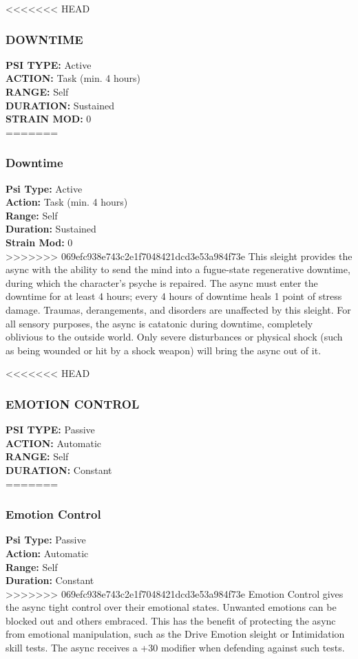 <<<<<<< HEAD \subsubsection{DOWNTIME} \textbf{PSI TYPE:} Active \\ \textbf{ACTION:} Task (min. 4 hours) \\ \textbf{RANGE:} Self \\ \textbf{DURATION:} Sustained \\ \textbf{STRAIN MOD:} 0 \\ ======= \subsubsection{Downtime} \textbf{Psi Type:} Active \\ \textbf{Action:} Task (min. 4 hours) \\ \textbf{Range:} Self \\ \textbf{Duration:} Sustained \\ \textbf{Strain Mod:} 0 \\ >>>>>>> 069efc938e743c2e1f7048421dcd3e53a984f73e This sleight provides the async with the ability to send the mind into a fugue-state regenerative downtime, during which the character’s psyche is repaired. The async must enter the downtime for at least 4 hours; every 4 hours of downtime heals 1 point of stress damage. Traumas, derangements, and disorders are unaffected by this sleight. For all sensory purposes, the async is catatonic during downtime, completely oblivious to the outside world. Only severe disturbances or physical shock (such as being wounded or hit by a shock weapon) will bring the async out of it. 

<<<<<<< HEAD \subsubsection{EMOTION CONTROL} \textbf{PSI TYPE:} Passive \\ \textbf{ACTION:} Automatic \\ \textbf{RANGE:} Self \\ \textbf{DURATION:} Constant \\ ======= \subsubsection{Emotion Control} \textbf{Psi Type:} Passive \\ \textbf{Action:} Automatic \\ \textbf{Range:} Self \\ \textbf{Duration:} Constant \\ >>>>>>> 069efc938e743c2e1f7048421dcd3e53a984f73e Emotion Control gives the async tight control over their emotional states. Unwanted emotions can be blocked out and others embraced. This has the benefit of protecting the async from emotional manipulation, such as the Drive Emotion sleight or Intimidation skill tests. The async receives a +30 modifier when defending against such tests. 

